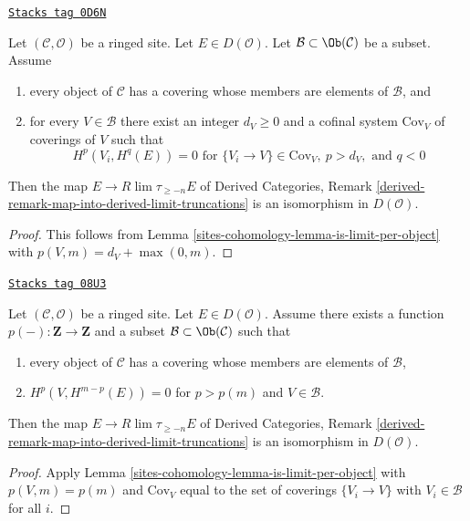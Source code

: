 \begin{lemma}
\label{sites-cohomology-lemma-is-limit-spaltenstein}
\href{https://stacks.math.columbia.edu/tag/0D6N}{\texttt{Stacks tag 0D6N}}

Let $(\mathcal{C}, \mathcal{O})$ be a ringed site. Let $E \in D(\mathcal{O})$.
Let $\mathcal{B} \subset \Ob(\mathcal{C})$ be a subset. Assume
\begin{enumerate}
\item every object of $\mathcal{C}$ has a covering whose members are
elements of $\mathcal{B}$, and
\item for every $V \in \mathcal{B}$ there exist an integer $d_V \geq 0$ and
a cofinal system $\text{Cov}_V$ of coverings of $V$ such that
$$
H^p(V_i, H^q(E)) = 0 \text{ for }
\{V_i \to V\} \in \text{Cov}_V,\ p > d_V, \text{ and }q < 0
$$
\end{enumerate}
Then the map $E \to R\lim \tau_{\geq -n} E$ of
Derived Categories, Remark
\ref{derived-remark-map-into-derived-limit-truncations}
is an isomorphism in $D(\mathcal{O})$.
\end{lemma}

\begin{proof}
This follows from Lemma \ref{sites-cohomology-lemma-is-limit-per-object}
with $p(V, m) = d_V + \max(0, m)$.
\end{proof}

\begin{lemma}[Is limit]
\label{sites-cohomology-lemma-is-limit}
\href{https://stacks.math.columbia.edu/tag/08U3}{\texttt{Stacks tag 08U3}}

Let $(\mathcal{C}, \mathcal{O})$ be a ringed site. Let $E \in D(\mathcal{O})$.
Assume there exists a function $p(-) : \mathbf{Z} \to \mathbf{Z}$
and a subset $\mathcal{B} \subset \Ob(\mathcal{C})$ such that
\begin{enumerate}
\item every object of $\mathcal{C}$ has a covering whose members are
elements of $\mathcal{B}$,
\item $H^p(V, H^{m - p}(E)) = 0$ for $p > p(m)$ and $V \in \mathcal{B}$.
\end{enumerate}
Then the map $E \to R\lim \tau_{\geq -n} E$ of
Derived Categories, Remark
\ref{derived-remark-map-into-derived-limit-truncations}
is an isomorphism in $D(\mathcal{O})$.
\end{lemma}

\begin{proof}
Apply Lemma \ref{sites-cohomology-lemma-is-limit-per-object}
with $p(V, m) = p(m)$ and $\text{Cov}_V$
equal to the set of coverings $\{V_i \to V\}$ with
$V_i \in \mathcal{B}$ for all $i$.
\end{proof}

